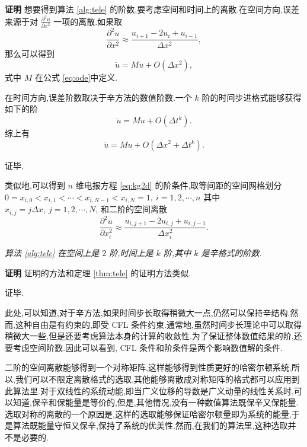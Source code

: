 {\textbf{证明}} 想要得到算法 \ref{alg:tele} 的阶数,要考虑空间和时间上的离散.在空间方向,误差来源于对 $\frac{\partial^2
u}{\partial x^2}$ 一项的离散.如果取
\begin{equation*}
\frac{\partial^2u}{\partial x^2}\approx \frac{u_{i+1}-2u_i+u_{i-1}}{\Delta x^2},
\end{equation*}
那么可以得到
\begin{equation*}
\ddot{u}=Mu+O(\Delta x^2),
\end{equation*}
式中 $M$ 在公式 \eqref{eq:ode}中定义.

在时间方向,误差阶数取决于辛方法的数值阶数.一个 $k$ 阶的时间步进格式能够获得如下的阶
\begin{equation*}
\ddot{u}=Mu+O(\Delta t^k).
\end{equation*}
综上有
\begin{equation*}
\ddot{u}=Mu+O(\Delta x^2+ \Delta t^k).
\end{equation*}

证毕.

类似地,可以得到 $n$ 维电报方程 \eqref{eq:kg2d} 的阶条件,取等间距的空间网格划分
$0=x_{i,0}<x_{i,1}<\cdots<x_{i,N-1}<x_{i,N}=1,~i=1,2,\cdots,n$ 其中
$x_{i,j}=j\Delta x,~j = 1,2,\cdots,N$, 和二阶的空间离散
\begin{equation*}
\frac{\partial^2u}{\partial x_i^2}\approx \frac{u_{i,j+1}-2u_{i,j}+u_{i,j-1}}{\Delta x_i^2}.
\end{equation*}

\begin{theorem}
\emph{算法 \ref{alg:tele} 在空间上是 $2$ 阶,时间上是 $k$ 阶,其中 $k$ 是辛格式的阶数.}
\end{theorem}

{\textbf{证明}} 证明的方法和定理 \ref{thm:tele} 的证明方法类似.

证毕.

此处,可以知道,对于辛方法,如果时间步长取得稍微大一点,仍然可以保持辛结构.然而,这种自由是有约束的,即受 CFL 条件约束.通常地,虽然时间步长理论中可以取得稍微大一些,但是还要考虑算法本身的计算的收敛性.为了保证整体数值结果的阶,还要考虑空间阶数.因此可以看到, CFL 条件和阶条件是两个影响数值解的条件.

二阶的空间离散能够得到一个对称矩阵,这样能够得到性质更好的哈密尔顿系统.所以,我们可以不限定离散格式的选取,其他能够离散成对称矩阵的格式都可以应用到此算法里.对于双线性的系统动能,即当广义位移的导数是广义动量的线性关系时,可以知道,保辛和保能量是等价的,但是,其他情况,没有一种数值算法既保辛又保能量.选取对称的离散的一个原因是,这样的选取能够保证哈密尔顿量即为系统的能量,于是算法既能量守恒又保辛,保持了系统的优美性.然而,在我们的算法里,这种选取并不是必要的.

